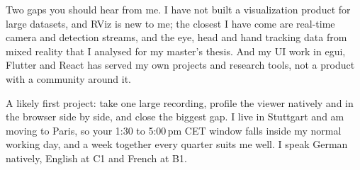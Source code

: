 {	Two gaps you should hear from me. I have not built a visualization product for large datasets, and RViz is new to me; the closest I have come are real-time camera and detection streams, and the eye, head and hand tracking data from mixed reality that I analysed for my master's thesis. And my UI work in egui, Flutter and React has served my own projects and research tools, not a product with a community around it.

	A likely first project: take one large recording, profile the viewer natively and in the browser side by side, and close the biggest gap. I live in Stuttgart and am moving to Paris, so your 1:30 to 5:00\,pm CET window falls inside my normal working day, and a week together every quarter suits me well. I speak German natively, English at C1 and French at B1.

}

